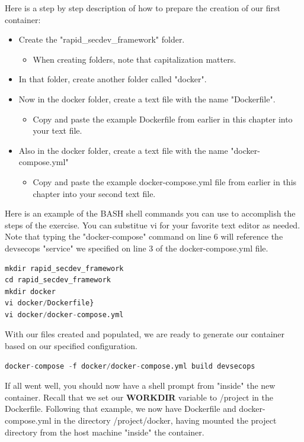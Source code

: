 \clearpage
\justify
Here is a step by step description of how to prepare the creation of our first container:

\begin{itemize}
\item Create the "rapid\_secdev\_framework" folder.
  \begin{itemize}
  \item When creating folders, note that capitalization matters.
  \end{itemize}
\item In that folder, create another folder called "docker".
\item Now in the docker folder, create a text file with the name "Dockerfile".
  \begin{itemize}
  \item
    Copy and paste the example Dockerfile from earlier in this chapter
    into your text file.
  \end{itemize}
\item Also in the docker folder, create a text file with the name "docker-compose.yml"
  \begin{itemize}
  \item Copy and paste the example docker-compose.yml file from earlier in this chapter into your second text file.
  \end{itemize}
\end{itemize}

\justify
Here is an example of the BASH shell commands you can use to accomplish
the steps of the exercise. You can substitue vi for your favorite text
editor as needed. Note that typing the "docker-compose" command on line
6 will reference the devsecops "service" we specified on line 3 of the
docker-compose.yml file.

\begin{lstlisting}[language=Python]
mkdir rapid_secdev_framework
cd rapid_secdev_framework
mkdir docker
vi docker/Dockerfile}
vi docker/docker-compose.yml
\end{lstlisting}
\justify
With our files created and populated, we are ready to generate our
container based on our specified configuration.

\begin{lstlisting}[language=Python]
docker-compose -f docker/docker-compose.yml build devsecops
\end{lstlisting}
\justify
If all went well, you should now have a shell prompt from "inside" the
new container. Recall that we set our \textbf{WORKDIR} variable to /project in the Dockerfile. Following that example, we now have Dockerfile and docker-compose.yml in the directory /project/docker, having mounted the project directory from the host machine "inside" the container.

